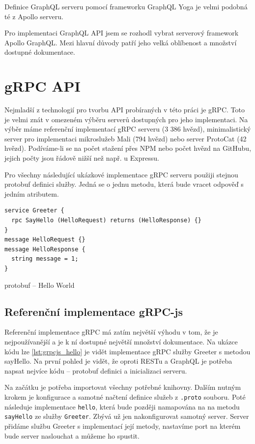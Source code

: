 \documentclass[thesis=M,czech]{FITthesis}[2019/12/23]
\begin{document}
Definice GraphQL serveru pomocí frameworku GraphQL Yoga je velmi podobná té z Apollo serveru.

Pro implementaci GraphQL API jsem se rozhodl vybrat serverový framework Apollo GraphQL. Mezi hlavní důvody patří jeho velká oblíbenost a množství dostupné dokumentace.
\clearpage

\section{gRPC API}
Nejmladší z technologií pro tvorbu API probíraných v této práci je gRPC. Toto je velmi znát v omezeném výběru serverů dostupných pro jeho implementaci. Na výběr máme referenční implementací gRPC serveru (3 386 hvězd), minimalistický server pro implementaci mikroslužeb Mali (794 hvězd) nebo server ProtoCat (42 hvězd). Podíváme-li se na počet stažení přes NPM nebo počet hvězd na GitHubu, jejich počty jsou řádově nižší než např. u Expressu.

Pro všechny následující ukázkové implementace gRPC serveru použiji stejnou protobuf definici služby. Jedná se o jednu metodu, která bude vracet odpověď s jedním atributem.

\begin{listing}[h]
\begin{verbatim}
service Greeter {
  rpc SayHello (HelloRequest) returns (HelloResponse) {}
}
message HelloRequest {}
message HelloResponse {
  string message = 1;
}
\end{verbatim}
\caption{protobuf -- Hello World}
\label{lst:protobuf_hello}
\end{listing}

\subsection{Referenční implementace gRPC-js}
Referenční implementace gRPC \cite{grpc_js} má zatím největší výhodu v tom, že je nejpoužívanější a je k ní dostupné největší množství dokumentace.
Na ukázce kódu lze \ref{lst:grpcjs_hello} je vidět implementace gRPC služby Greeter s metodou sayHello. Na první pohled je vidět, že oproti RESTu a GraphQL je potřeba napsat nejvíce kódu -- protobuf definici a inicializaci serveru.

Na začátku je potřeba importovat všechny potřebné knihovny. Dalším nutným krokem je konfigurace a samotné načtení definice služeb z \texttt{.proto} souboru. Poté následuje implementace \texttt{hello}, která bude později namapována na na metodu \texttt{sayHello} ze služby \texttt{Greeter}. Zbývá už jen nakonfigurovat samotný server. Server přidáme službu Greeter s implementací její metody, nastavíme port na kterém bude server naslouchat a můžeme ho spustit.
\end{document}
